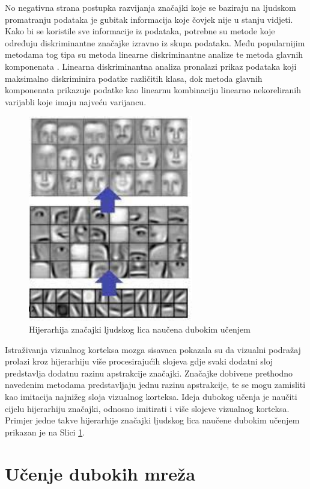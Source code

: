 \documentclass[lmodern, utf8, diplomski, numeric]{fer}
\begin{document}
No negativna strana postupka razvijanja značajki koje se baziraju na ljudskom promatranju podataka je gubitak informacija koje čovjek nije u stanju vidjeti. Kako bi se koristile sve informacije iz podataka, potrebne su metode koje određuju diskriminantne značajke izravno iz skupa podataka. Među popularnijim metodama tog tipa su metoda linearne diskriminantne analize  te metoda glavnih komponenata . Linearna diskriminantna analiza pronalazi prikaz podataka koji maksimalno diskriminira podatke različitih klasa, dok metoda glavnih komponenata prikazuje podatke kao linearnu kombinaciju linearno nekoreliranih varijabli koje imaju najveću varijancu.

\begin{figure}[ht!]
\centering
\includegraphics[height=9cm]{slike/feature_hierarchy.png}
\caption{Hijerarhija značajki ljudskog lica naučena dubokim učenjem}
\label{fig:hierarchy}
\end{figure}

Istraživanja vizualnog korteksa mozga sisavaca pokazala su da vizualni podražaj prolazi kroz hijerarhiju više procesirajućih slojeva gdje svaki dodatni sloj predstavlja dodatnu razinu apstrakcije značajki.  Značajke dobivene prethodno navedenim metodama predstavljaju jednu razinu apstrakcije, te se mogu zamisliti kao imitacija najnižeg sloja vizualnog korteksa. Ideja dubokog učenja je naučiti cijelu hijerarhiju značajki, odnosno imitirati i više slojeve vizualnog korteksa. Primjer jedne takve hijerarhije značajki ljudskog lica naučene dubokim učenjem prikazan je na Slici \ref{fig:hierarchy}.


\section{Učenje dubokih mreža}
\end{document}
